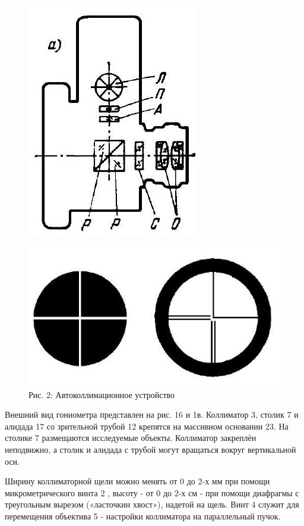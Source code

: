 \documentclass[a4paper, 12pt]{article}
\begin{document}
\begin{figure}[H]
    \centering
    \includegraphics[scale=0.4]{2023_04_02_a48ae02e429ba186bcd7g-1(1)}

    \includegraphics[scale=0.4]{2023_04_02_a48ae02e429ba186bcd7g-1}\\
    Рис. 2: Автоколлимационное устройство
    \label{fig:my_label}
\end{figure}

Внешний вид гониометра представлен на рис. 16 и 1в. Коллиматор 3, столик 7 и алидада 17 со зрительной трубой 12 крепятся на массивном основании 23. На столике 7 размещаются исследуемые объекты. Коллиматор закреплён неподвижно, а столик и алидада с трубой могут вращаться вокруг вертикальной оси.

Ширину коллиматорной щели можно менять от 0 до 2-х мм при помощи микрометрического винта 2 , высоту - от 0 до 2-х см - при помощи диафрагмы с треугольным вырезом («ласточкин хвост»), надетой на щель. Винт 4 служит для перемещения объектива 5 - настройки коллиматора на параллельный пучок.
\end{document}
